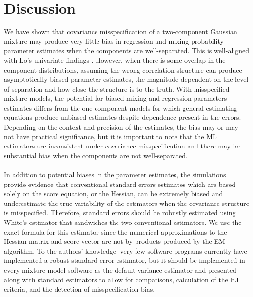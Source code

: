 \documentclass[10pt]{article}
\begin{document}
\section{Discussion}
We have shown that covariance misspecification of a two-component Gaussian mixture may produce very little bias in regression and mixing probability parameter estimates when the components are well-separated. This is well-aligned with Lo's univariate findings \cite{lo2011}. However, when there is some overlap in the component distributions, assuming the wrong correlation structure can produce asymptotically biased parameter estimates, the magnitude dependent on the level of separation and how close the structure is to the truth. With misspecified mixture models, the potential for biased mixing and regression parameters estimates differs from the one component models for which general estimating equations \cite{liang1986} produce unbiased estimates despite dependence present in the errors. Depending on the context and precision of the estimates, the bias may or may not have practical significance, but it is important to note that the ML estimators are inconsistent under covariance misspecification and there may be substantial bias when the components are not well-separated.\\\\
In addition to potential biases in the parameter estimates, the simulations provide evidence that conventional standard errors estimates which are based solely on the score equation, or the Hessian, can be extremely biased and underestimate the true variability of the estimators when the covariance structure is misspecified. Therefore, standard errors should be robustly estimated using White's estimator that sandwiches the two conventional estimators. We use the exact formula for this estimator since the numerical approximations to the Hessian matrix and score vector are not by-products produced by the EM algorithm. To the authors' knowledge, very few software programs currently have implemented a robust standard error estimator, but it should be implemented in every mixture model software as the default variance estimator and presented along with standard estimators to allow for comparisons, calculation of the RJ criteria, and the detection of misspecification bias. \\\\
\end{document}
